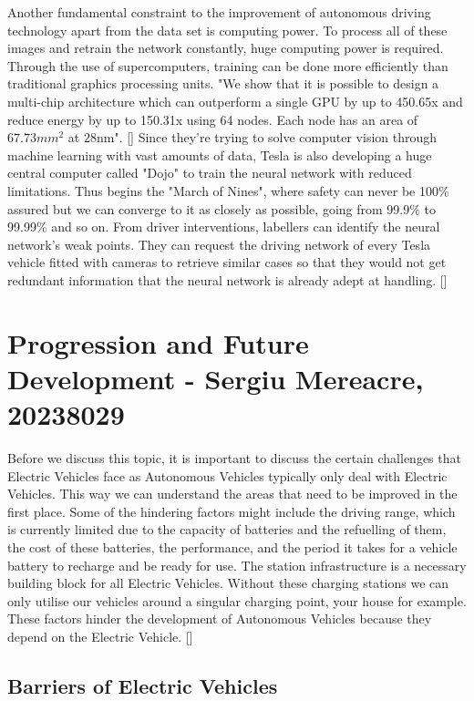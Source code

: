 \documentclass{article}
\begin{document}
Another fundamental constraint to the improvement of autonomous driving technology apart from the data set is computing power. To process all of these images and retrain the network constantly, huge computing power is required. Through the use of supercomputers, training can be done more efficiently than traditional graphics processing units. "We show that it is possible to design a multi-chip architecture which can outperform a single GPU by up to 450.65x and reduce energy by up to 150.31x using 64 nodes. Each node has an area of $67.73mm^2$ at 28nm". [\textcite{chen2014dadiannao}] Since they're trying to solve computer vision through machine learning with vast amounts of data, Tesla is also developing a huge central computer called "Dojo" to train the neural network with reduced limitations. Thus begins the "March of Nines", where safety can never be 100\% assured but we can converge to it as closely as possible, going from 99.9\% to 99.99\% and so on. From driver interventions, labellers can identify the neural network's weak points. They can request the driving network of every Tesla vehicle fitted with cameras to retrieve similar cases so that they would not get redundant information that the neural network is already adept at handling. [\textcite{autonomyday}]

\section{Progression and Future Development - Sergiu Mereacre, 20238029}

Before we discuss this topic, it is important to discuss the certain challenges that Electric Vehicles face as Autonomous Vehicles typically only deal with Electric Vehicles. This way we can understand the areas that need to be improved in the first place. Some of the hindering factors might include the driving range, which is currently limited due to the capacity of batteries and the refuelling of them, the cost of these batteries, the performance, and the period it takes for a vehicle battery to recharge and be ready for use. The station infrastructure is a necessary building block for all Electric Vehicles. Without these charging stations we can only utilise our vehicles around a singular charging point, your house for example. These factors hinder the development of Autonomous Vehicles because they depend on the Electric Vehicle. [\textcite{bimbraw2015autonomous}]

\subsection{Barriers of Electric Vehicles}
\end{document}
